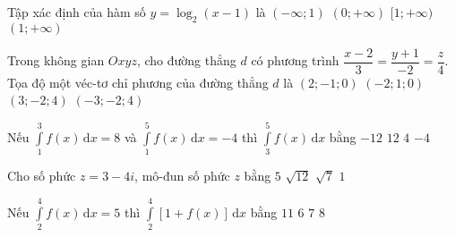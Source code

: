 \begin{ex}%
	Tập xác định của hàm số $y=\log_2(x-1)$ là
	\choice
	{$(-\infty;1)$}
	{$(0;+\infty)$}
	{$[1;+\infty)$}
	{\True $(1;+\infty)$}
\end{ex}

\begin{ex}%
	Trong không gian $Oxyz$, cho đường thẳng $d$ có phương trình $\dfrac{x-2}{3}=\dfrac{y+1}{-2}=\dfrac{z}{4}$. Tọa độ một véc-tơ chỉ phương của đường thẳng $d$ là
	\choice
	{$(2;-1;0)$}
	{$(-2;1;0)$}
	{\True $(3;-2;4)$}
	{$(-3;-2;4)$}
\end{ex}

\begin{ex}%
	Nếu $\displaystyle\int\limits_1^3{f(x)\mathrm{\,d}x=8}$ và $\displaystyle\int\limits_1^5{f(x)\mathrm{\,d}x=-4}$ thì $\displaystyle\int\limits_3^5{f(x)\mathrm{\,d}x}$ bằng
	\choice
	{\True $-12$}
	{$12$}
	{$4$}
	{$-4$}
\end{ex}

\begin{ex}%
	Cho số phức $z=3-4i$, mô-đun số phức $z$ bằng
	\choice
	{\True $5$}
	{$\sqrt{12}$}
	{$\sqrt{7}$}
	{$1$}
\end{ex}

\begin{ex}%
	Nếu $\displaystyle\int\limits_2^4{f(x)\mathrm{\,d}x=5}$ thì ${\displaystyle\int\limits_2^4{\left[1+f(x)\right]\mathrm{\,d}x}}$ bằng
	\choice
	{$11$}
	{$6$}
	{\True $7$}
	{$8$}
\end{ex}

